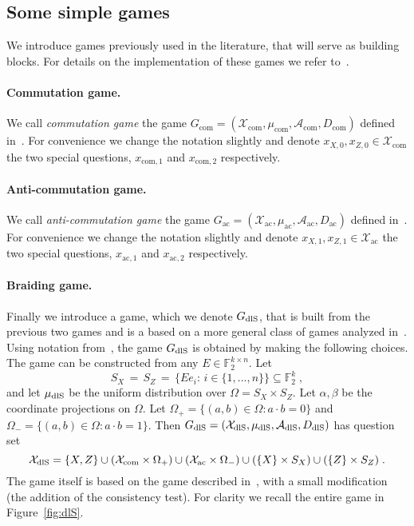 \documentclass[11pt]{article}
\theoremstyle{definition}
\newcommand{\field}{\mathbb{F}_2}
\newcommand{\dlS}{\ensuremath{\rm dlS}}
\newcommand{\F}{\ensuremath{\mathbb{F}}}
\newcommand{\mA}{\ensuremath{\mathcal{A}}}
\newcommand{\mX}{\ensuremath{\mathcal{X}}}
\newcommand{\cc}{\mathrm{com}}
\newcommand{\ac}{\mathrm{ac}}
\begin{document}
\subsection{Some simple games}

We introduce games previously used in the literature, that will serve as building blocks. For details on the implementation of these games we refer to~\cite{de2022spectral}.

\paragraph{Commutation game.}
We call \emph{commutation game} the game $G_{\cc}=(\mX_\cc,\mu_\cc,\mA_\cc,D_\cc)$ defined in~\cite[Section 3.1]{de2022spectral}. For convenience we change the notation slightly and denote $x_{X,0}, x_{Z,0} \in \mX_{\cc}$ the two special questions, $x_{\cc,1}$ and $x_{\cc,2}$ respectively. 

\paragraph{Anti-commutation game.}
We call \emph{anti-commutation game} the game $G_\ac=(\mX_\ac,\mu_\ac,\mA_\ac,D_\ac)$ defined in~\cite[Section 3.2]{de2022spectral}. For convenience we change the notation slightly and  denote $x_{X,1}, x_{Z,1} \in \mX_{\ac}$ the two special questions, $x_{\ac,1}$ and $x_{\ac,2}$ respectively. 

\paragraph{Braiding game.}
Finally we introduce a game, which we denote $G_{\dlS}$, that is built from the previous two games and is a based on a more general class of games analyzed in~\cite[Section 3.4]{de2022spectral}.  Using notation from~\cite{de2022spectral}, the game $G_{\dlS}$ is obtained by making the following choices. The game can be constructed from any $E\in\F_2^{k\times n}$. Let 
\begin{equation}\label{eq:dls-sets}
 S_X\,=\,S_Z\,=\,\{E e_i:\,i\in\{1,\ldots,n\}\}\subseteq \field^k\;,
\end{equation}
and let $\mu_{\dlS}$ be the uniform distribution over $\Omega=S_X\times S_Z$. Let $\alpha,\beta$ be the coordinate projections on $\Omega$. Let $\Omega_+ = \{(a,b)\in \Omega:a\cdot b=0\}$ and $\Omega_-=\{(a,b)\in\Omega:a\cdot b=1\}$. Then $G_{\dlS}=(\mX_{\dlS},\mu_{\dlS},\mA_{\dlS},D_{\dlS})$ has question set 
\[ \mX_{\dlS} = \{X,Z\} \cup (\mX_{\cc}\times \Omega_+) \cup (\mX_{\ac} \times \Omega_-) \cup (\{X\}\times S_X) \cup (\{Z\}\times S_Z)\;.\]
The game itself is based on the game described in~\cite[Section 3.4]{de2022spectral}, with a small modification (the addition of the consistency test). For clarity we recall the entire game in Figure~\ref{fig:dlS}. 
\end{document}
